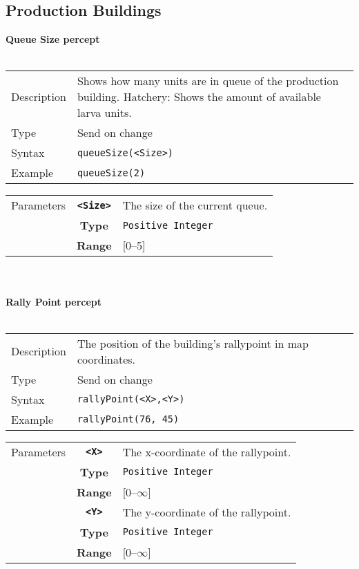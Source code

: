 \subsection{Production Buildings}
\textbf{Queue Size percept}\\
\\
\begin{tabularx}{\textwidth}{lX}
 Description & Shows how many units are in queue of the production building.
 \newline
 Hatchery: Shows the amount of available larva units.\\
 Type & Send on change \\
 Syntax & \verb|queueSize(<Size>)| \\
 Example & \verb|queueSize(2)| \\
 \end{tabularx}
 \begin{tabularx}{\textwidth}{l | c | p{8cm}|}
 \cline{2-3}
 Parameters & \textbf{\verb|<Size>|} & The size of the current queue. \\
            & \textbf{Type} & \verb|Positive Integer| \\
            & \textbf{Range} & [0--5] \\
            \cline{2-3}
\end{tabularx}\\
\\
\noindent
\textbf{Rally Point percept}\\
\\
\begin{tabularx}{\textwidth}{lX}
 Description & The position of the building's rallypoint in map coordinates. \\
 Type & Send on change \\
 Syntax & \verb|rallyPoint(<X>,<Y>)| \\
 Example & \verb|rallyPoint(76, 45)| \\
 \end{tabularx}
 \begin{tabularx}{\textwidth}{l | c | p{8cm}|}
 \cline{2-3}
 Parameters & \textbf{\verb|<X>|} & The x-coordinate of the rallypoint.\\
            & \textbf{Type} & \verb|Positive Integer| \\
            & \textbf{Range} & [0--$\infty$] \\
            \cline{2-3}
            & \textbf{\verb|<Y>|} & The y-coordinate of the rallypoint.\\
            & \textbf{Type} & \verb|Positive Integer| \\
            & \textbf{Range} & [0--$\infty$] \\
            \cline{2-3}
\end{tabularx}\\
\\

